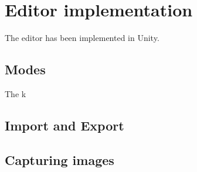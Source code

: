 \section{Editor implementation}
The editor has been implemented in Unity.


\subsection{Modes}
The k


\subsection{Import and Export}

\subsection{Capturing images}


